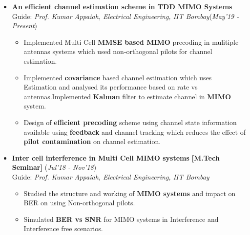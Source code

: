 \documentclass[10pt]{article}
\begin{document}

\vspace*{115pt}    %

\colorbox{bl}{}%
\vspace{-0.1cm}
\begin{itemize}[leftmargin=0.4cm]


\item \textbf{An efficient channel estimation scheme in TDD MIMO Systems}\\
Guide: \textit{Prof. Kumar Appaiah, Electrical Engineering, IIT Bombay}\hfill{(\textit{May’19 - Present})}\\\vspace{-0.68cm}
    \begin{itemize}[leftmargin=0.5cm]
    \item Implemented Multi Cell \textbf{MMSE based MIMO }precoding in mulitiple antennas systems which used
non-orthogonal pilots for channel estimation.\vspace{-0.1cm}
    \item Implemented \textbf{covariance} based channel estimation which uses  Estimation and analysed its performance based on rate vs antennas.Implemented \textbf{Kalman} filter to estimate channel in \textbf{MIMO} system.\vspace{-0.1cm}
    \item  Design of \textbf{efficient precoding }scheme using channel state information available using \textbf{feedback} and channel
tracking which reduces the effect of \textbf{pilot contamination} on channel estimation.\vspace{-0.1cm}

    \end{itemize}

\vspace{-0.25cm}

\item \textbf{Inter cell interference in Multi Cell MIMO systems
} \textbf{[M.Tech Seminar]}
\hfill{(\textit{Jul'18 - Nov'18})}\\
Guide: \textit{Prof. Kumar Appaiah, Electrical Engineering, IIT Bombay}\\\vspace{-0.68cm}
    \begin{itemize}
    \item Studied the structure and working of \textbf{MIMO systems} and impact on BER on using Non-orthogonal pilots.\vspace{-0.1cm}
    \item Simulated \textbf{BER vs SNR} for MIMO systems in Interference and Interference free scenarios.\vspace{-0.1cm}

    \end{itemize}\
    \vspace{-0.6cm}
\end{itemize}
\end{document}
